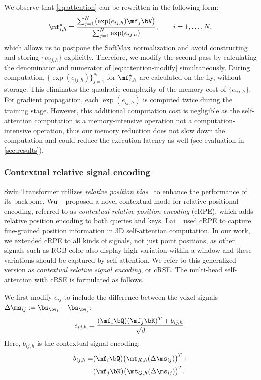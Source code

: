 \documentclass[10pt,twocolumn,letterpaper]{article}
\begin{document}
We observe that \cref{eq:attention} can be rewritten in the following form:
\begin{equation}\label{eq:attention-modify}
\mf^\star_{i,h} = \dfrac{\sum_{j=1}^N \bigl(\exp(e_{ij,h}) \mf_j \bV\bigr)}{\sum_{j=1}^N \exp(e_{ij,h})}, \qquad i=1,\ldots, N,
\end{equation}
which allows us to postpone the SoftMax normalization and avoid constructing and storing $\{\alpha_{ij,h}\}$ explicitly. Therefore, we modify the second pass by calculating the denominator and numerator of \cref{eq:attention-modify} simultaneously. During computation, $\{\exp(e_{ij,h})\}_{j=1}^N$ for $\mf^\star_{i,h}$ are calculated on the fly, without storage. This eliminates the quadratic complexity of the memory cost of $\{\alpha_{ij,h}\}$. For gradient propagation, each $\exp(e_{ij,h})$ is computed twice during the training stage. However, this additional computation cost is negligible as the self-attention computation is a memory-intensive operation not a computation-intensive operation, thus our memory reduction does not slow down the computation and could reduce the execution latency as well (see evaluation in \cref{sec:results}).

\subsubsection{Contextual relative signal encoding}

Swin Transformer utilizes \emph{relative position bias}~\cite{shaw2018self} to enhance the performance of its backbone. Wu \etal~\cite{wu2021rethinking} proposed a novel contextual mode for relative positional encoding, referred to as \emph{contextual relative position encoding} (cRPE), which adds relative position encoding to both queries and keys. Lai \etal~\cite{lai2022stratified} used cRPE to capture fine-grained position information in 3D self-attention computation. In our work, we extended cRPE to all kinds of signals, not just point positions, as other signals such as RGB color also display high variation within a window and these variations should be captured by self-attention. We refer to this generalized version as \emph{contextual relative signal encoding}, or cRSE. The multi-head self-attention with cRSE is formulated as follows.

We first modify $e_{ij}$ to include the difference between the voxel signals $\Delta \ms_{ij} := \bs_{\bv_i}-\bs_{\bv_j}$:
\begin{equation}
e_{ij,h} = \dfrac{(\mf_i \bQ) (\mf_j \bK)^T + b_{ij,h}}{\sqrt{d}}.
\end{equation}
Here, $b_{ij,h}$ is the contextual signal encoding:
\begin{align}
   b_{ij,h} = &(\mf_i \bQ) \bigl(\mt_{K,h}(\Delta \ms_{ij})\bigr)^T + \nonumber \\& (\mf_j \bK) \bigl(\mt_{Q,h}(\Delta \ms_{ij})\bigr)^T.
\end{align}
\end{document}
